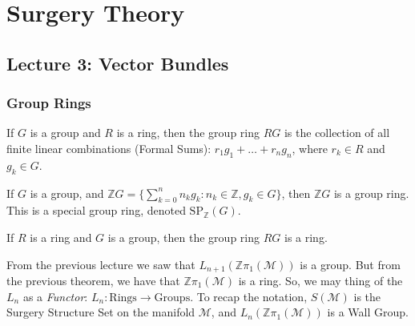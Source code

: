 \documentclass[crop=false,class=article,oneside]{standalone}
\begin{document}
    \ifx\ifmathcoursessurgery\undefined
        \section*{Surgery Theory}
        \setcounter{section}{1}
        \renewcommand\thefigure{%
            \arabic{section}.\arabic{figure}%
        }
        \renewcommand\thesubfigure{%
            \arabic{section}.\arabic{figure}.\arabic{subfigure}%
        }
    \fi
    \subsection{Lecture 3: Vector Bundles}
        \subsubsection{Group Rings}
            \begin{definition}
                If $G$ is a group and $R$ is a ring, then the
                group ring $RG$ is the collection of all
                finite linear combinations (Formal Sums):
                $r_{1}g_{1}+\hdots+r_{n}g_{n}$, where
                $r_{k}\in{R}$ and $g_{k}\in{G}$.
            \end{definition}
            \begin{example}
                If $G$ is a group, and
                $\mathbb{Z}G=\{\sum_{k=0}^{n}n_{k}g_{k}:%
                 n_{k}\in\mathbb{Z},g_{k}\in{G}\}$, then
                $\mathbb{Z}G$ is a group ring. This is a
                special group ring, denoted
                $\textrm{SP}_{\mathbb{Z}}(G)$.
            \end{example}
            \begin{theorem}
                If $R$ is a ring and $G$ is a group, then
                the group ring $RG$ is a ring.
            \end{theorem}
            From the previous lecture we saw that
            $L_{n+1}(\mathbb{Z}\pi_{1}(\mathcal{M}))$ is
            a group. But from the previous theorem, we have
            that $\mathbb{Z}\pi_{1}(\mathcal{M})$ is a ring.
            So, we may thing of the $L_{n}$ as a \textit{Functor}:
            $L_{n}:\textrm{Rings}\rightarrow\textrm{Groups}$.
            To recap the notation, $S(\mathcal{M})$ is the
            Surgery Structure Set on the manifold
            $\mathcal{M}$, and
            $L_{n}(\mathbb{Z}\pi_{1}(\mathcal{M}))$ is
            a Wall Group.
\end{document}
